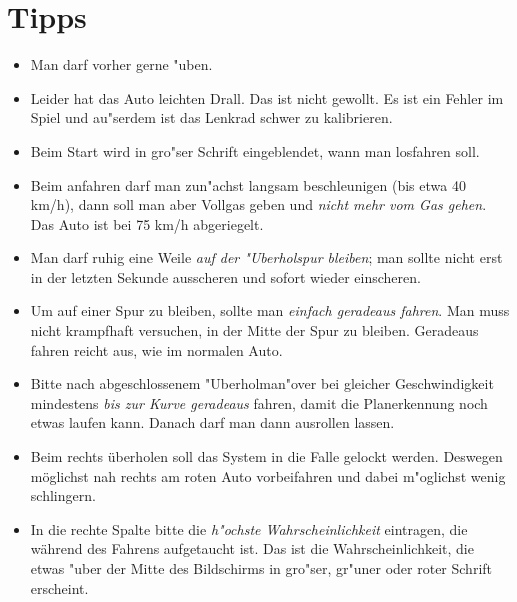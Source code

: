 \documentclass[a4paper,12pt]{scrartcl}
\begin{document}
\section*{Tipps}
\begin{itemize}
\item Man darf vorher gerne "uben.
\item Leider hat das Auto leichten Drall. Das ist nicht gewollt.
    Es ist ein Fehler im Spiel und au"serdem ist das Lenkrad schwer
    zu kalibrieren.
\item Beim Start wird in gro"ser Schrift eingeblendet, wann man losfahren
    soll.
\item Beim anfahren darf man zun"achst langsam beschleunigen (bis etwa
    40 km/h), dann soll man aber Vollgas geben und {\em nicht mehr vom
    Gas gehen}.
    Das Auto ist bei 75 km/h abgeriegelt.
\item Man darf ruhig eine Weile {\em auf der "Uberholspur bleiben};
    man sollte nicht erst in der letzten Sekunde ausscheren
    und sofort wieder einscheren.
\item Um auf einer Spur zu bleiben, sollte man {\em einfach geradeaus
    fahren}. Man muss nicht krampfhaft versuchen, in der Mitte
    der Spur zu bleiben. Geradeaus fahren reicht aus,
    wie im normalen Auto.
\item Bitte nach abgeschlossenem "Uberholman"over bei gleicher
    Geschwindigkeit mindestens {\em bis zur Kurve geradeaus} fahren,
    damit die Planerkennung noch etwas laufen kann.
    Danach darf man dann ausrollen lassen.
\item Beim rechts \"uberholen soll das System in die Falle gelockt
    werden. Deswegen m\"oglichst nah rechts am roten Auto
    vorbeifahren und dabei m"oglichst wenig schlingern.
\item In die rechte Spalte bitte die {\em h"ochste Wahrscheinlichkeit}
    eintragen, die w\"ahrend des Fahrens aufgetaucht ist.
    Das ist die Wahrscheinlichkeit, die etwas "uber der Mitte des
    Bildschirms in gro"ser, gr"uner oder roter Schrift erscheint.
\end{itemize}
\end{document}
